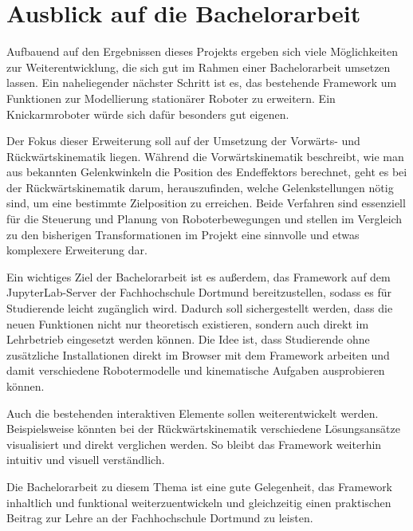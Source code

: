 \section{Ausblick auf die Bachelorarbeit}

Aufbauend auf den Ergebnissen dieses Projekts ergeben sich viele Möglichkeiten zur Weiterentwicklung, die sich gut im Rahmen einer Bachelorarbeit umsetzen lassen.
Ein naheliegender nächster Schritt ist es, das bestehende Framework um Funktionen zur Modellierung stationärer Roboter zu erweitern. Ein Knickarmroboter würde sich dafür besonders gut eigenen.

Der Fokus dieser Erweiterung soll auf der Umsetzung der Vorwärts- und Rück\-wärts\-ki\-ne\-ma\-tik liegen. Während die Vorwärtskinematik beschreibt,
wie man aus bekannten Gelenkwinkeln die Position des Endeffektors berechnet, geht es bei der Rück\-wärts\-ki\-ne\-ma\-tik darum, herauszufinden,
welche Gelenkstellungen nötig sind, um eine bestimmte Zielposition zu erreichen.
Beide Verfahren sind essenziell für die Steuerung und Planung von Roboterbewegungen und stellen im
Vergleich zu den bisherigen Transformationen im Projekt eine sinnvolle und etwas komplexere Erweiterung dar.

Ein wichtiges Ziel der Bachelorarbeit ist es außerdem, das Framework auf dem JupyterLab-Server der Fachhochschule Dortmund bereitzustellen,
sodass es für Studierende leicht zugänglich wird. Dadurch soll sichergestellt werden, dass die neuen Funktionen nicht nur theoretisch existieren,
sondern auch direkt im Lehrbetrieb eingesetzt werden können. Die Idee ist,
dass Studierende ohne zusätzliche Installationen direkt im Browser mit dem Framework arbeiten und damit verschiedene Robotermodelle und kinematische Aufgaben ausprobieren können.

Auch die bestehenden interaktiven Elemente sollen weiterentwickelt werden.
Beispielsweise könnten bei der Rückwärtskinematik verschiedene Lösungsansätze visualisiert und direkt verglichen werden.
So bleibt das Framework weiterhin intuitiv und visuell verständlich.

Die Bachelorarbeit zu diesem Thema ist eine gute Gelegenheit,
das Framework inhaltlich und funktional weiterzuentwickeln und gleichzeitig einen praktischen Beitrag zur Lehre an der Fachhochschule Dortmund zu leisten.